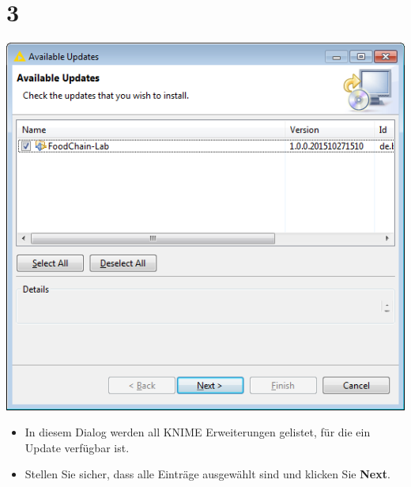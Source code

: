 \documentclass{beamer}
\begin{document}
\section{3}
\begin{frame}
	\begin{center}
  		\includegraphics[height=0.6\textheight]{3.png}
	\end{center}
	\begin{itemize}
		\item In diesem Dialog werden all KNIME Erweiterungen gelistet, für die ein Update verfügbar ist.
		\item Stellen Sie sicher, dass alle Einträge ausgewählt sind und klicken Sie \textbf{Next}.
	\end{itemize}
\end{frame}
\end{document}
